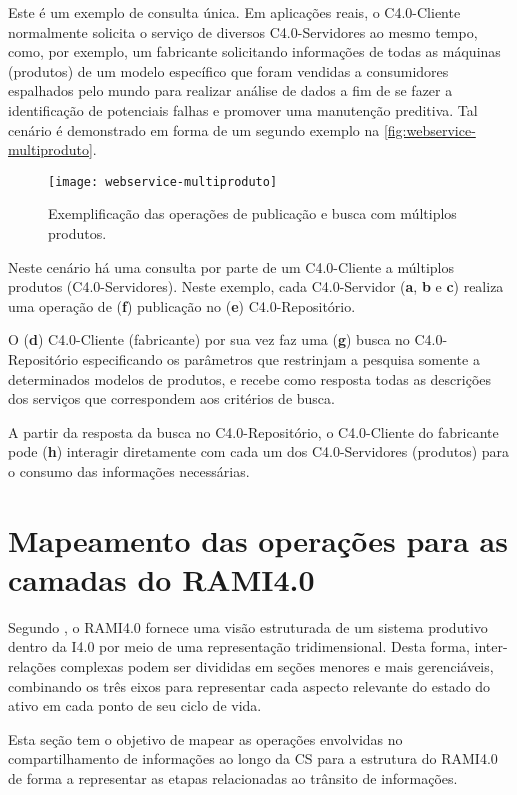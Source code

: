 Este é um exemplo de consulta única. Em aplicações reais, o C4.0-Cliente normalmente solicita o serviço de diversos C4.0-Servidores ao mesmo tempo, como, por exemplo, um fabricante solicitando informações de todas as máquinas (produtos) de um modelo específico que foram vendidas a consumidores espalhados pelo mundo para realizar análise de dados a fim de se fazer a identificação de potenciais falhas e promover uma manutenção preditiva. Tal cenário é demonstrado em forma de um segundo exemplo na \autoref{fig:webservice-multiproduto}.

\begin{figure}[htb]
	\centering
	\texttt{[image: webservice-multiproduto]}
	\caption{Exemplificação das operações de publicação e busca com múltiplos produtos.}
	\label{fig:webservice-multiproduto}
\end{figure}

Neste cenário há uma consulta por parte de um C4.0-Cliente a múltiplos produtos (C4.0-Servidores). Neste exemplo, cada C4.0-Servidor (\textbf{a}, \textbf{b} e \textbf{c}) realiza uma operação de (\textbf{f}) publicação no (\textbf{e}) C4.0-Repositório.

O (\textbf{d}) C4.0-Cliente (fabricante) por sua vez faz uma (\textbf{g}) busca no C4.0-Repositório especificando os parâmetros que restrinjam a pesquisa somente a determinados modelos de produtos, e recebe como resposta todas as descrições dos serviços que correspondem aos critérios de busca.

A partir da resposta da busca no C4.0-Repositório, o C4.0-Cliente do fabricante pode (\textbf{h}) interagir diretamente com cada um dos C4.0-Servidores (produtos) para o consumo das informações necessárias.

\section{Mapeamento das operações para as camadas do RAMI4.0}
\label{sec:mapeamento-das-operacoes}

Segundo , o RAMI4.0 fornece uma visão estruturada de um sistema produtivo dentro da I4.0 por meio de uma representação tridimensional. Desta forma, inter-relações complexas podem ser divididas em seções menores e mais gerenciáveis, combinando os três eixos para representar cada aspecto relevante do estado do ativo em cada ponto de seu ciclo de vida.

Esta seção tem o objetivo de mapear as operações envolvidas no compartilhamento de informações ao longo da CS para a estrutura do RAMI4.0 de forma a representar as etapas relacionadas ao trânsito de informações.

